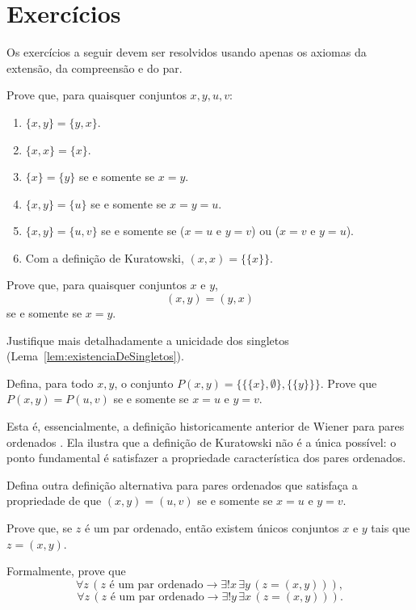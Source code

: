 \section*{Exercícios}
Os exercícios a seguir devem ser resolvidos usando apenas os axiomas da extensão, da compreensão e do par.
\begin{exercise}
    Prove que, para quaisquer conjuntos $x, y, u, v$:
    \begin{enumerate}[label=(\alph*)]
        \item $\{x, y\} = \{y, x\}$.
        \item $\{x, x\} = \{x\}$.
        \item $\{x\} = \{y\}$ se e somente se $x = y$.
        \item $\{x, y\} = \{u\}$ se e somente se $x = y = u$.
        \item $\{x, y\} = \{u, v\}$ se e somente se ($x = u$ e $y = v$) ou ($x = v$ e $y = u$).
        \item Com a definição de Kuratowski, $(x, x) = \{\{x\}\}$.
    \end{enumerate}
\end{exercise}
\begin{exercise}
    Prove que, para quaisquer conjuntos $x$ e $y$,
    \[
        (x, y) = (y, x)
    \]
    se e somente se $x = y$.
\end{exercise}
\begin{exercise}\label{exr:unicidadeDosSingletos}
    Justifique mais detalhadamente a unicidade dos singletos (Lema~\ref{lem:existenciaDeSingletos}).
\end{exercise}
\begin{exercise}
    Defina, para todo $x, y$, o conjunto $P(x, y) = \{\{\{x\}, \emptyset\}, \{\{y\}\}\}$. Prove que $P(x, y) = P(u, v)$ se e somente se $x = u$ e $y = v$.

    Esta é, essencialmente, a definição historicamente anterior de Wiener para pares ordenados \cite{wiener1914simplification}.
    Ela ilustra que a definição de Kuratowski não é a única possível: o ponto fundamental é satisfazer a propriedade característica dos pares ordenados.
\end{exercise}
\begin{exercise}
    Defina outra definição alternativa para pares ordenados que satisfaça a propriedade de que $(x, y) = (u, v)$ se e somente se $x = u$ e $y = v$.
\end{exercise}
\begin{exercise}
    Prove que, se $z$ é um par ordenado, então existem únicos conjuntos $x$ e $y$ tais que $z = (x, y)$.

    Formalmente, prove que
    \[
        \forall z\, (z \text{ é um par ordenado} \rightarrow \exists! x\, \exists y\, (z = (x, y))),
    \]
    \[
        \forall z\, (z \text{ é um par ordenado} \rightarrow \exists! y\, \exists x\, (z = (x, y))).
    \]
\end{exercise}

